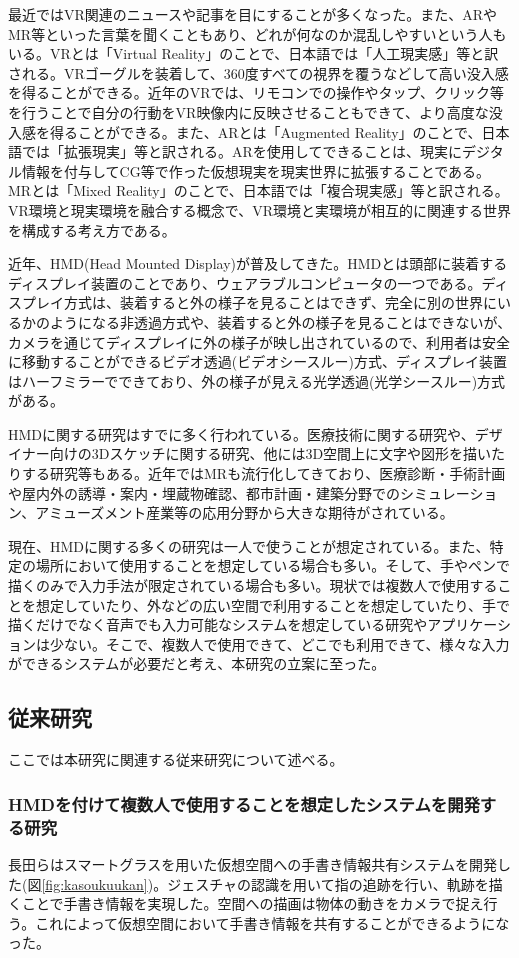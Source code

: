 \documentclass[11pt,a4j, titlepage]{jarticle} %
\begin{document}
最近ではVR関連のニュースや記事を目にすることが多くなった。また、ARやMR等といった言葉を聞くこともあり、どれが何なのか混乱しやすいという人もいる。VRとは「Virtual Reality」のことで、日本語では「人工現実感」等と訳される。VRゴーグルを装着して、360度すべての視界を覆うなどして高い没入感を得ることができる。近年のVRでは、リモコンでの操作やタップ、クリック等を行うことで自分の行動をVR映像内に反映させることもできて、より高度な没入感を得ることができる。また、ARとは「Augmented Reality」のことで、日本語では「拡張現実」等と訳される。ARを使用してできることは、現実にデジタル情報を付与してCG等で作った仮想現実を現実世界に拡張することである。MRとは「Mixed Reality」のことで、日本語では「複合現実感」等と訳される。VR環境と現実環境を融合する概念で、VR環境と実環境が相互的に関連する世界を構成する考え方である。

近年、HMD(Head Mounted Display)が普及してきた。HMDとは頭部に装着するディスプレイ装置のことであり、ウェアラブルコンピュータの一つである。ディスプレイ方式は、装着すると外の様子を見ることはできず、完全に別の世界にいるかのようになる非透過方式や、装着すると外の様子を見ることはできないが、カメラを通じてディスプレイに外の様子が映し出されているので、利用者は安全に移動することができるビデオ透過(ビデオシースルー)方式、ディスプレイ装置はハーフミラーでできており、外の様子が見える光学透過(光学シースルー)方式がある。

HMDに関する研究はすでに多く行われている。医療技術に関する研究や、デザイナー向けの3Dスケッチに関する研究、他には3D空間上に文字や図形を描いたりする研究等もある。近年ではMRも流行化してきており、医療診断・手術計画や屋内外の誘導・案内・埋蔵物確認、都市計画・建築分野でのシミュレーション、アミューズメント産業等の応用分野から大きな期待がされている\cite{mr}。

現在、HMDに関する多くの研究は一人で使うことが想定されている。また、特定の場所において使用することを想定している場合も多い。そして、手やペンで描くのみで入力手法が限定されている場合も多い。現状では複数人で使用することを想定していたり、外などの広い空間で利用することを想定していたり、手で描くだけでなく音声でも入力可能なシステムを想定している研究やアプリケーションは少ない。そこで、複数人で使用できて、どこでも利用できて、様々な入力ができるシステムが必要だと考え、本研究の立案に至った。

\subsection{従来研究}
ここでは本研究に関連する従来研究について述べる。
\subsubsection{HMDを付けて複数人で使用することを想定したシステムを開発する研究}
長田ら\cite{nagata}はスマートグラスを用いた仮想空間への手書き情報共有システムを開発した(図\ref{fig:kasoukuukan})。ジェスチャの認識を用いて指の追跡を行い、軌跡を描くことで手書き情報を実現した。空間への描画は物体の動きをカメラで捉え行う。これによって仮想空間において手書き情報を共有することができるようになった。
\end{document}
